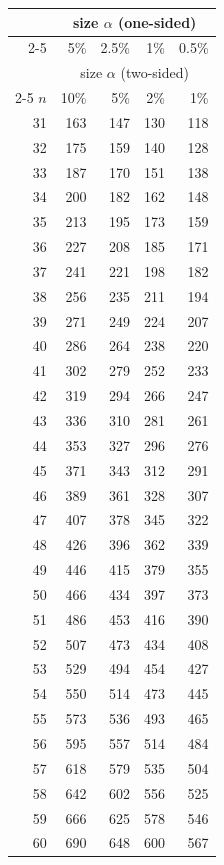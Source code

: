 \begin{minipage}[t]{0.32\textwidth}
	\centering
	\begin{tabular}{rrrrr}
		& \multicolumn{4}{c}{size $\alpha$ (one-sided)} \\
		\cline{2-5}
		& 5\% & 2.5\% & 1\% & 0.5\% \\
		& \multicolumn{4}{c}{size $\alpha$ (two-sided)} \\
		\cline{2-5}
		$n$ & 10\% & 5\% & 2\% & 1\% \\
		\midrule
		31 & 163 & 147 & 130 & 118 \\
		32 & 175 & 159 & 140 & 128 \\
		33 & 187 & 170 & 151 & 138 \\
		34 & 200 & 182 & 162 & 148 \\
		35 & 213 & 195 & 173 & 159 \\
		36 & 227 & 208 & 185 & 171 \\
		37 & 241 & 221 & 198 & 182 \\
		38 & 256 & 235 & 211 & 194 \\
		39 & 271 & 249 & 224 & 207 \\
		40 & 286 & 264 & 238 & 220 \\[5pt]
		41 & 302 & 279 & 252 & 233 \\
		42 & 319 & 294 & 266 & 247 \\
		43 & 336 & 310 & 281 & 261 \\
		44 & 353 & 327 & 296 & 276 \\
		45 & 371 & 343 & 312 & 291 \\
		46 & 389 & 361 & 328 & 307 \\
		47 & 407 & 378 & 345 & 322 \\
		48 & 426 & 396 & 362 & 339 \\
		49 & 446 & 415 & 379 & 355 \\
		50 & 466 & 434 & 397 & 373 \\[5pt]
		51 & 486 & 453 & 416 & 390 \\
		52 & 507 & 473 & 434 & 408 \\
		53 & 529 & 494 & 454 & 427 \\
		54 & 550 & 514 & 473 & 445 \\
		55 & 573 & 536 & 493 & 465 \\
		56 & 595 & 557 & 514 & 484 \\
		57 & 618 & 579 & 535 & 504 \\
		58 & 642 & 602 & 556 & 525 \\
		59 & 666 & 625 & 578 & 546 \\
		60 & 690 & 648 & 600 & 567 \\
		\midrule
	\end{tabular}
\end{minipage}
